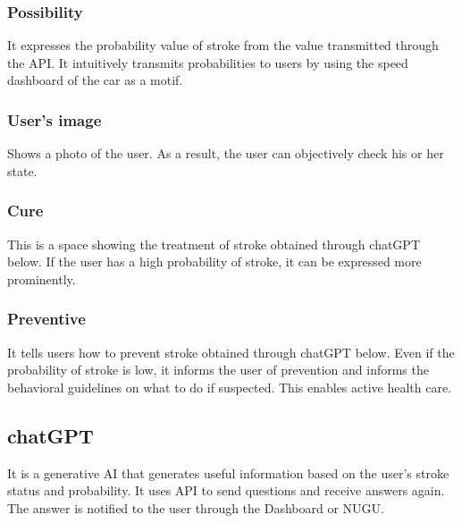 \subsubsection{Possibility}
It expresses the probability value of stroke from the value transmitted through the API. It intuitively transmits probabilities to users by using the speed dashboard of the car as a motif.
\subsubsection{User's image}
Shows a photo of the user. As a result, the user can objectively check his or her state.
\subsubsection{Cure}
This is a space showing the treatment of stroke obtained through chatGPT below. If the user has a high probability of stroke, it can be expressed more prominently.
\subsubsection{Preventive}
It tells users how to prevent stroke obtained through chatGPT below. Even if the probability of stroke is low, it informs the user of prevention and informs the behavioral guidelines on what to do if suspected. This enables active health care.

\subsection{chatGPT}
It is a generative AI that generates useful information based on the user's stroke status and probability. It uses API to send questions and receive answers again. The answer is notified to the user through the Dashboard or NUGU.
